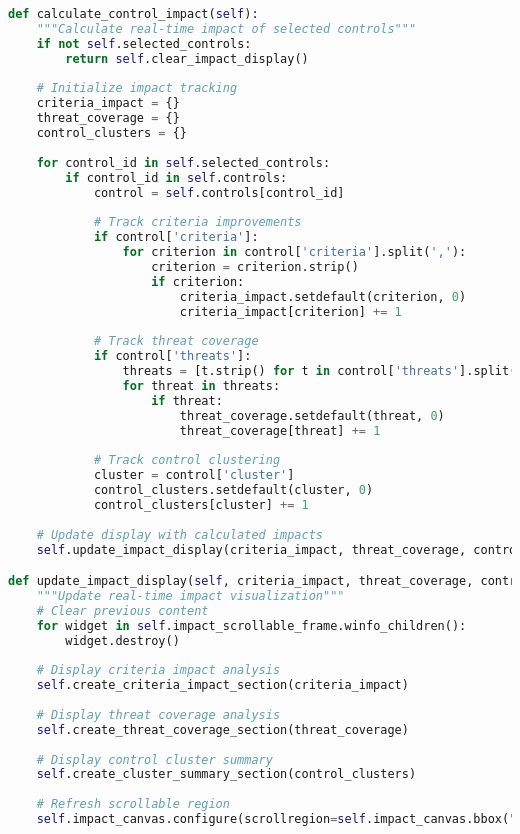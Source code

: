 \documentclass[binding=0.6cm]{sapthesis}
\begin{document}
\begin{lstlisting}[language=Python, caption=Dynamic Impact Analysis Implementation]
def calculate_control_impact(self):
    """Calculate real-time impact of selected controls"""
    if not self.selected_controls:
        return self.clear_impact_display()
    
    # Initialize impact tracking
    criteria_impact = {}
    threat_coverage = {}
    control_clusters = {}
    
    for control_id in self.selected_controls:
        if control_id in self.controls:
            control = self.controls[control_id]
            
            # Track criteria improvements
            if control['criteria']:
                for criterion in control['criteria'].split(','):
                    criterion = criterion.strip()
                    if criterion:
                        criteria_impact.setdefault(criterion, 0)
                        criteria_impact[criterion] += 1
            
            # Track threat coverage
            if control['threats']:
                threats = [t.strip() for t in control['threats'].split(',')]
                for threat in threats:
                    if threat:
                        threat_coverage.setdefault(threat, 0)
                        threat_coverage[threat] += 1
            
            # Track control clustering
            cluster = control['cluster']
            control_clusters.setdefault(cluster, 0)
            control_clusters[cluster] += 1
    
    # Update display with calculated impacts
    self.update_impact_display(criteria_impact, threat_coverage, control_clusters)

def update_impact_display(self, criteria_impact, threat_coverage, control_clusters):
    """Update real-time impact visualization"""
    # Clear previous content
    for widget in self.impact_scrollable_frame.winfo_children():
        widget.destroy()
    
    # Display criteria impact analysis
    self.create_criteria_impact_section(criteria_impact)
    
    # Display threat coverage analysis
    self.create_threat_coverage_section(threat_coverage)
    
    # Display control cluster summary
    self.create_cluster_summary_section(control_clusters)
    
    # Refresh scrollable region
    self.impact_canvas.configure(scrollregion=self.impact_canvas.bbox("all"))
\end{lstlisting}
\end{document}
